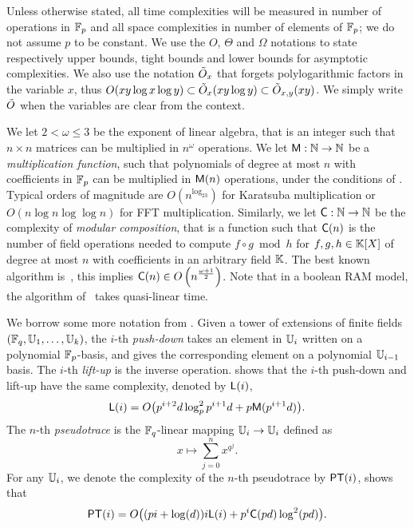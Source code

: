 Unless otherwise stated, all time complexities will be measured in
number of operations in $\mathbb{F}_p$ and all space complexities in number of
elements of $\mathbb{F}_p$; we do not assume $p$ to be constant. We use the
$O$, $\Theta$ and $\Omega$ notations to state respectively upper
bounds, tight bounds and lower bounds for asymptotic complexities. We
also use the notation $\tilde{O}_x$ that forgets polylogarithmic factors
in the variable $x$, thus $O(xy\log x \log y)\subset\tilde{O}_x(xy\log
y)\subset\tilde{O}_{x,y}(xy)$. We simply write $\tilde{O}$ when the variables
are clear from the context.

We let $2<\omega\le3$ be the exponent of linear algebra, that is an
integer such that $n\times n$ matrices can be multiplied in $n^\omega$
operations. We let $\mathrm{\sf M}:\mathbb{N}\rightarrow\mathbb{N}$ be a \emph{multiplication
  function}, such that polynomials of degree at most $n$ with
coefficients in $\mathbb{F}_p$ can be multiplied in $\mathrm{\sf M}(n)$ operations,
under the conditions of \cite[Ch. 8.3]{vzGG}. Typical orders of
magnitude are $O(n^{\log_23})$ for Karatsuba multiplication or
$O(n\log n\log\log n)$ for FFT multiplication. Similarly, we let
$\mathrm{\sf C}:\mathbb{N}\rightarrow\mathbb{N}$ be the complexity of \emph{modular
  composition}, that is a function such that $\mathrm{\sf C}(n)$ is the
number of field operations needed to compute $f\circ g\bmod h$ for
$f,g,h\in\mathbb{K}[X]$ of degree at most $n$ with coefficients in an
arbitrary field $\mathbb{K}$. The best known algorithm is~\cite{BrKu78}, this
implies $\mathrm{\sf C}(n)\in O\left(n^{\frac{\omega+1}{2}}\right)$. Note
that in a boolean RAM model, the algorithm of~\cite{KeUm08} takes
quasi-linear time.

We borrow some more notation from \cite{DFS09}. Given a tower of
extensions of finite fields $(\mathbb{F}_q,\mathbb{U}_1,\ldots,\mathbb{U}_k)$, the $i$-th
\emph{push-down} takes an element in $\mathbb{U}_i$ written on a polynomial
$\mathbb{F}_p$-basis, and gives the corresponding element on a polynomial
$\mathbb{U}_{i-1}$ basis. The $i$-th \emph{lift-up} is the inverse
operation. \cite[Th. 13]{DFS09} shows that the $i$-th push-down
and lift-up have the same complexity, denoted by ${\sf L}(i)$,
\[{\sf L}(i) = O\bigl(p^{i+2}d\log_p^2{p^{i+1}d} +
p\mathrm{\sf M}(p^{i+1}d)\bigr) \text{.}\] 
The $n$-th \emph{pseudotrace} is the
$\mathbb{F}_q$-linear mapping $\mathbb{U}_i\rightarrow\mathbb{U}_i$ defined as
\begin{equation*}
  x\mapsto\sum_{j=0}^{n}x^{q^j}
  \text{.}
\end{equation*}
For any $\mathbb{U}_i$, we denote the complexity of the $n$-th pseudotrace by
${\sf PT}(i)$, \cite[Th. 20]{DFS09} shows that
\[{\sf PT}(i) = O\bigl((pi + \log(d))i{\sf L}(i) + p^i\mathrm{\sf C}(pd)\log^2(pd)\bigr)\text{.}\]



